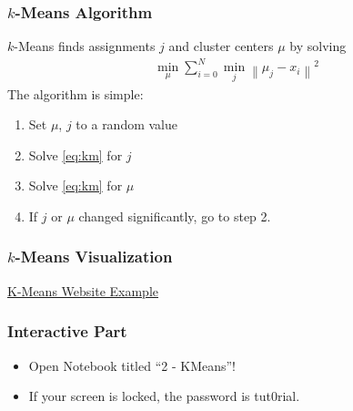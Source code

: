 \begin{frame}
    \frametitle{$k$-Means Algorithm}
    $k$-Means finds assignments $j$ and cluster centers $\mu$ by solving
    \begin{align}
        \min_{\mu}\sum_{i=0}^{N} \min_j\left\|\mu_j-x_i\right\|^2
        \label{eq:km}
    \end{align}
    The algorithm is simple:
    \begin{enumerate}
        \item Set $\mu$, $j$ to a random value
        \item Solve \eqref{eq:km} for $j$
        \item Solve \eqref{eq:km} for $\mu$
        \item If $j$ or $\mu$ changed significantly, go to step 2.
    \end{enumerate}
\end{frame}

\begin{frame}
    \frametitle{$k$-Means Visualization}
    \begin{center}
    \href{http://icperformance.com/wp-content/demos/kmeansmouse.html}{K-Means 
        Website Example}
    \end{center}
\end{frame}

\begin{frame}
  \frametitle{Interactive Part}
  \begin{itemize}
      \item Open Notebook titled ``2 - KMeans''!
      \item If your screen is locked, the password is \alert{tut0rial}.
  \end{itemize}
\end{frame}
